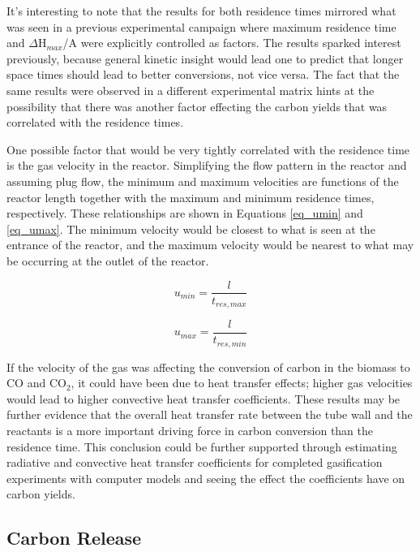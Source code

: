 \documentclass[11pt,twocolumn]{article}
\begin{document}
It's interesting to note that the results for both residence times mirrored what was seen in a previous experimental campaign where maximum residence time and $\Delta$H$_{max}$/A were explicitly controlled as factors.  The results sparked interest previously, because general kinetic insight would lead one to predict that longer space times should lead to better conversions, not vice versa.  The fact that the same results were observed in a different experimental matrix hints at the possibility that there was another factor effecting the carbon yields that was correlated with the residence times.

One possible factor that would be very tightly correlated with the residence time is the gas velocity in the reactor.  Simplifying the flow pattern in the reactor and assuming plug flow, the minimum and maximum velocities are functions of the reactor length together with the maximum and minimum residence times, respectively.  These relationships are shown in Equations \ref{eq_umin} and \ref{eq_umax}.  The minimum velocity would be closest to what is seen at the entrance of the reactor, and the maximum velocity would be nearest to what may be occurring at the outlet of the reactor.


\begin{equation}
u_{min} = \frac{l}{t_{res,max}}
\label{eq_umin}
\end{equation}

\begin{equation}
u_{max} = \frac{l}{t_{res,min}}
\label{eq_umax}
\end{equation}

If the velocity of the gas was affecting the conversion of carbon in the biomass to CO and CO$_2$, it could have been due to heat transfer effects; higher gas velocities would lead to higher convective heat transfer coefficients.  These results may be further evidence that the overall heat transfer rate between the tube wall and the reactants is a more important driving force in carbon conversion than the residence time.  This conclusion could be further supported through estimating radiative and convective heat transfer coefficients for completed gasification experiments with computer models and seeing the effect the coefficients have on carbon yields.

\subsection*{Carbon Release}
\end{document}
